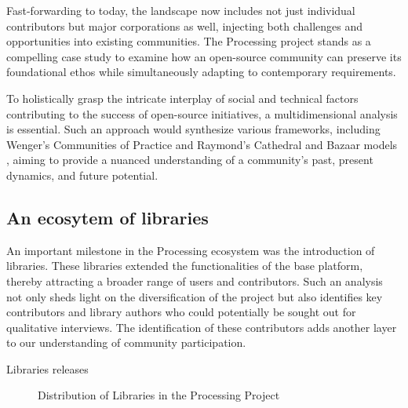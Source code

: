 Fast-forwarding to today, the landscape now includes not just individual contributors but major corporations as well, injecting both challenges and opportunities into existing communities. The Processing project stands as a compelling case study to examine how an open-source community can preserve its foundational ethos while simultaneously adapting to contemporary requirements.

To holistically grasp the intricate interplay of social and technical factors contributing to the success of open-source initiatives, a multidimensional analysis is essential. Such an approach would synthesize various frameworks, including Wenger's Communities of Practice \parencite{wengerCommunitiesPracticeLearning1998} and Raymond's Cathedral and Bazaar models \parencite{CathedralBazaarMusings2002a}, aiming to provide a nuanced understanding of a community's past, present dynamics, and future potential.

\subsection{An ecosytem of libraries}
An important milestone in the Processing ecosystem was the introduction of libraries. These libraries extended the functionalities of the base platform, thereby attracting a broader range of users and contributors. Such an analysis not only sheds light on the diversification of the project but also identifies key contributors and library authors who could potentially be sought out for qualitative interviews. The identification of these contributors adds another layer to our understanding of community participation.

\changepapersize{305.3mm:210mm}

{
	\LARGE
	\noindent Libraries releases
}

\begin{figure}[H]
	
	\caption{Distribution of Libraries in the Processing Project}
	\label{figure:libraries}
\end{figure}

